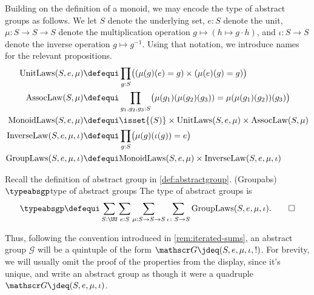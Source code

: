   Building on the definition of a monoid, we may encode the type of abstract 
  groups as follows. We let $S$ denote the underlying set, $e : S$ denote the unit, 
  $\mu:S\to S\to S$ denote the multiplication operation 
  $g\mapsto (h \mapsto g\cdot h)$, and $\iota : S \to S$ denote 
  the inverse operation $g \mapsto g^{-1}$.  Using\label{not:GroupLaws}
  that notation, we introduce names for the relevant propositions.
  \begin{align*}
    \mathrm{UnitLaws}(S,e,\mu)   & \defequi
    \prod_{g:S} \bigl((\mu{}(g)(e) = g)\times(\mu{}(e)(g) = g) \bigr)\\
    \mathrm{AssocLaw}(S,\mu{})   & \defequi\prod_{g_1,g_2,g_3:S} 
    \bigl( \mu{}(g_1)(\mu{}(g_2)(g_3))=\mu{}(\mu{}(g_1)(g_2))(g_3) \bigr)\\
    \mathrm{MonoidLaws}(S,e,\mu) & \defequi \isset{(S)} 
    \times \mathrm{UnitLaws}(S,e,\mu) \times \mathrm{AssocLaw}(S,\mu{}) \\
    \mathrm{InverseLaw}(S,e,\mu,\iota) & \defequi 
    \prod_{g:S}\bigl( \mu(g)(\iota(g)) = e \bigr) \\
    \mathrm{GroupLaws}(S,e,\mu,\iota) & \defequi 
    \mathrm{MonoidLaws}(S,e,\mu) \times \mathrm{InverseLaw}(S,e,\mu,\iota)
  \end{align*}

\begin{definition}
  \label{def:type-abstrgp}
  Recall the definition of abstract group in \cref{def:abstractgroup}.
  \glossary(Groupabs){$\protect\typeabsgp$}{type of abstract groups}
  The type of abstract groups is
  \[
    \typeabsgp \defequi \sum_{S:\UU} \sum_{e:S}\sum_{\mu{}:S\to S\to S}
    \sum_{\iota\colon S\to S} \mathrm{GroupLaws}(S,e,\mu,\iota).\qedhere
  \]
\end{definition}

  Thus, following the convention introduced in \cref{rem:iterated-sums},
  an abstract group $\mathscr G$ will be a quintuple of the form
  $\mathscr G \jdeq (S,e,\mu,\iota,!)$.  For brevity, we will usually 
  omit the proof of the properties from the display, since it's unique,
  and write an abstract group as though it were a quadruple 
  $\mathscr G \jdeq (S,e,\mu,\iota)$.


